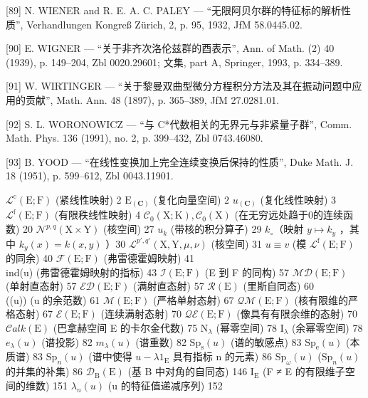 {[}89{]} N. WIENER and R. E. A. C. PALEY — “无限阿贝尔群的特征标的解析性质”, Verhandlungen Kongreß Zürich, 2, p. 95, 1932, JfM 58.0445.02.

{[}90{]} E. WIGNER — “关于非齐次洛伦兹群的酉表示”, Ann. of Math. (2) 40 (1939), p. 149–204, Zbl 0020.29601; 文集, part A, Springer, 1993, p. 334–389.

{[}91{]} W. WIRTINGER — “关于黎曼双曲型微分方程积分方法及其在振动问题中应用的贡献”, Math. Ann. 48 (1897), p. 365–389, JfM 27.0281.01.

{[}92{]} S. L. WORONOWICZ — “与 C*代数相关的无界元与非紧量子群”, Comm. Math. Phys. 136 (1991), no. 2, p. 399–432, Zbl 0743.46080.

{[}93{]} B. YOOD — “在线性变换加上完全连续变换后保持的性质”, Duke Math. J. 18 (1951), p. 599–612, Zbl 0043.11901.


\(\mathcal{L}^{\mathrm{c}}(\mathrm{E};\mathrm{F})\) (紧线性映射) 2 \(\mathrm{E}_{(\mathbf{C})}\) (复化向量空间) 2 \(u_{(\mathbf{C})}\) (复化线性映射) 3 \(\mathcal{L}^{\mathrm{f}}(\mathrm{E};\mathrm{F})\) (有限秩线性映射) 4 \(\mathcal{C}_0(\mathrm{X};\mathrm{K}), \mathcal{C}_0(\mathrm{X})\) (在无穷远处趋于0的连续函数) 20 \(\mathcal{N}^{p,q}(\mathrm{X} \times \mathrm{Y})\) (核空间) 27 \(u_k\) (带核的积分算子) 29 \(k_\circ\)（映射 \(y \mapsto k_y\) ，其中 \(k_y(x) = k(x,y)\) ）30 \(\mathcal{L}^{p',q'}(\mathrm{X},\mathrm{Y},\mu,\nu)\) (核空间) 31 \(u \equiv v\) (模 \(\mathcal{L}^{\mathrm{f}}(\mathrm{E};\mathrm{F})\) 的同余) 40 \(\mathcal{F}(\mathrm{E};\mathrm{F})\) (弗雷德霍姆映射) 41\\
ind(u) (弗雷德霍姆映射的指标) 43 \(\mathcal{I}(\mathrm{E};\mathrm{F})\) (E 到 F 的同构) 57 \(\mathcal{M}\mathcal{D}(\mathrm{E};\mathrm{F})\) (单射直态射) 57 \(\mathcal{E}\mathcal{D}(\mathrm{E};\mathrm{F})\) (满射直态射) 57 \(\mathcal{R}(\mathrm{E})\) (里斯自同态) 60\\
((u)) (u 的余范数) 61 \(\mathcal{M}(\mathrm{E};\mathrm{F})\) (严格单射态射) 67 \(\mathcal{Q}\mathcal{M}(\mathrm{E};\mathrm{F})\) (核有限维的严格态射) 67 \(\mathcal{E}(\mathrm{E};\mathrm{F})\) (连续满射态射) 70 \(\mathcal{Q}\mathcal{E}(\mathrm{E};\mathrm{F})\) (像具有有限余维的态射) 70 \(\mathcal{C}alk(\mathrm{E})\) (巴拿赫空间 E 的卡尔金代数) 75 \(\mathrm{N}_{\lambda}\) (幂零空间) 78 \(\mathrm{I}_{\lambda}\) (余幂零空间) 78 \(e_{\lambda}(u)\) (谱投影) 82 \(m_{\lambda}(u)\) (谱重数) 82 \(\mathrm{Sp}_{\mathrm{s}}(u)\) (谱的敏感点) 83 \(\mathrm{Sp}_{\mathrm{e}}(u)\) (本质谱) 83 \(\mathrm{Sp}_{n}(u)\) (谱中使得 \(u - \lambda 1_{\mathrm{E}}\) 具有指标 n 的元素) 86 \(\mathrm{Sp}_{\omega}(u)\) (\(\mathrm{Sp}_{n}(u)\) 的并集的补集) 86 \(\mathcal{D}_{\mathrm{B}}(\mathrm{E})\) (基 B 中对角的自同态) 146 \(\mathrm{I}_{\mathrm{E}}\) (F ≠ E 的有限维子空间的维数) 151 \(\lambda_n(u)\) (u 的特征值递减序列) 152

